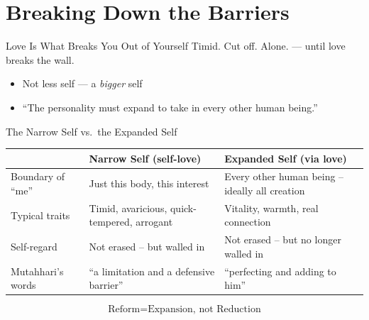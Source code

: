 \section{Breaking Down the Barriers}

\begin{frame}{Love Is What Breaks You Out of Yourself}
{\footnotesize Timid. Cut off. Alone. --- until love breaks the wall.}
\begin{itemize}[itemsep=3pt]
  \item Not less self --- a \emph{bigger} self
  \item ``The personality must expand to take in every other human being.''
\end{itemize}

\end{frame}

\begin{frame}{The Narrow Self vs.\ the Expanded Self}

\centering
\scriptsize
\renewcommand{\arraystretch}{1.4}

\begin{tabular}{|l|p{4.3cm}|p{4.3cm}|}
\hline
& \textbf{Narrow Self (self-love)} & \textbf{Expanded Self (via love)} \\
\hline
Boundary of ``me'' & Just this body, this interest & Every other human being -- ideally all creation \\
\hline
Typical traits & Timid, avaricious, quick-tempered, arrogant & Vitality, warmth, real connection \\
\hline
Self-regard & Not erased -- but walled in & Not erased -- but no longer walled in \\
\hline
Mutahhari's words & ``a limitation and a defensive barrier'' & ``perfecting and adding to him'' \\
\hline
\end{tabular}

\vspace{0.4cm}

\large
\[
\boxed{\text{Reform} = \text{Expansion, not Reduction}}
\]

\end{frame}

